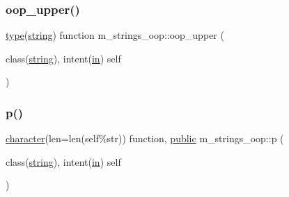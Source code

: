\subsubsection{\texorpdfstring{oop\+\_\+upper()}{oop\_upper()}}
{\footnotesize\ttfamily \hyperlink{stop__watch_83_8txt_a70f0ead91c32e25323c03265aa302c1c}{type}(\hyperlink{structm__strings__oop_1_1string}{string}) function m\+\_\+strings\+\_\+oop\+::oop\+\_\+upper (\begin{DoxyParamCaption}\item[{class(\hyperlink{structm__strings__oop_1_1string}{string}), intent(\hyperlink{M__journal_83_8txt_afce72651d1eed785a2132bee863b2f38}{in})}]{self }\end{DoxyParamCaption})\hspace{0.3cm}{\ttfamily [private]}}

\mbox{\label{namespacem__strings__oop_a456e651940e317c7bc885d95458c7fcb}} 
\subsubsection{\texorpdfstring{p()}{p()}}
{\footnotesize\ttfamily \hyperlink{option__stopwatch_83_8txt_abd4b21fbbd175834027b5224bfe97e66}{character}(len=len(self\%str)) function, \hyperlink{M__stopwatch_83_8txt_a2f74811300c361e53b430611a7d1769f}{public} m\+\_\+strings\+\_\+oop\+::p (\begin{DoxyParamCaption}\item[{class(\hyperlink{structm__strings__oop_1_1string}{string}), intent(\hyperlink{M__journal_83_8txt_afce72651d1eed785a2132bee863b2f38}{in})}]{self }\end{DoxyParamCaption})}

\mbox{\label{namespacem__strings__oop_a64192a93804fcb61ca59725245ee85c2}} 

